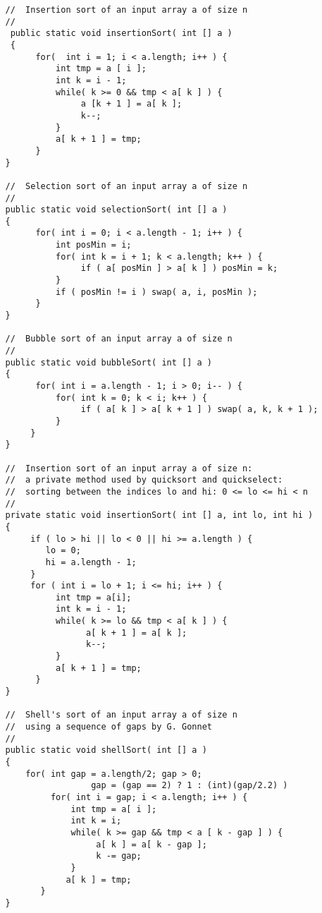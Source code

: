 {\footnotesize
\renewcommand{\ttdefault}{pcr} %
\begin{verbatim}
   //  Insertion sort of an input array a of size n
   //
    public static void insertionSort( int [] a ) 
    { 
         for(  int i = 1; i < a.length; i++ ) { 
             int tmp = a [ i ]; 
             int k = i - 1; 
             while( k >= 0 && tmp < a[ k ] ) { 
                  a [k + 1 ] = a[ k ]; 
                  k--; 
             } 
             a[ k + 1 ] = tmp; 
         } 
   } 
 
   //  Selection sort of an input array a of size n
   //
   public static void selectionSort( int [] a ) 
   { 
         for( int i = 0; i < a.length - 1; i++ ) { 
             int posMin = i; 
             for( int k = i + 1; k < a.length; k++ ) {
                  if ( a[ posMin ] > a[ k ] ) posMin = k; 
             }
             if ( posMin != i ) swap( a, i, posMin );
         }
   } 
 
   //  Bubble sort of an input array a of size n
   //
   public static void bubbleSort( int [] a ) 
   { 
         for( int i = a.length - 1; i > 0; i-- ) { 
             for( int k = 0; k < i; k++ ) {
                  if ( a[ k ] > a[ k + 1 ] ) swap( a, k, k + 1 );
             }
        }
   } 
 
   //  Insertion sort of an input array a of size n: 
   //  a private method used by quicksort and quickselect: 
   //  sorting between the indices lo and hi: 0 <= lo <= hi < n
   //
   private static void insertionSort( int [] a, int lo, int hi ) 
   { 
        if ( lo > hi || lo < 0 || hi >= a.length ) { 
           lo = 0;
           hi = a.length - 1;
        } 
        for ( int i = lo + 1; i <= hi; i++ ) { 
             int tmp = a[i]; 
             int k = i - 1; 
             while( k >= lo && tmp < a[ k ] ) { 
                   a[ k + 1 ] = a[ k ]; 
                   k--; 
             } 
             a[ k + 1 ] = tmp; 
         } 
   } 

   //  Shell's sort of an input array a of size n
   //  using a sequence of gaps by G. Gonnet
   //
   public static void shellSort( int [] a ) 
   { 
       for( int gap = a.length/2; gap > 0; 
                    gap = (gap == 2) ? 1 : (int)(gap/2.2) ) 
            for( int i = gap; i < a.length; i++ ) { 
                int tmp = a[ i ]; 
                int k = i; 
                while( k >= gap && tmp < a [ k - gap ] ) { 
                     a[ k ] = a[ k - gap ]; 
                     k -= gap; 
                } 
               a[ k ] = tmp; 
          } 
   } 
 

\end{verbatim}}

